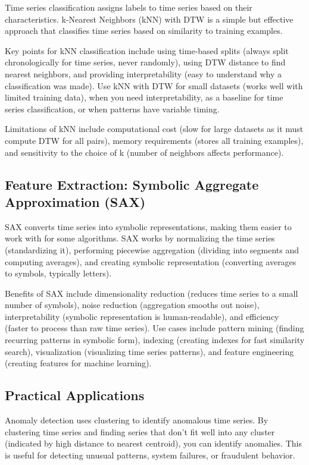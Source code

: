 Time series classification assigns labels to time series based on their characteristics. k-Nearest Neighbors (kNN) with DTW is a simple but effective approach that classifies time series based on similarity to training examples.

Key points for kNN classification include using time-based splits (always split chronologically for time series, never randomly), using DTW distance to find nearest neighbors, and providing interpretability (easy to understand why a classification was made). Use kNN with DTW for small datasets (works well with limited training data), when you need interpretability, as a baseline for time series classification, or when patterns have variable timing.

Limitations of kNN include computational cost (slow for large datasets as it must compute DTW for all pairs), memory requirements (stores all training examples), and sensitivity to the choice of k (number of neighbors affects performance).

\subsection{Feature Extraction: Symbolic Aggregate Approximation (SAX)}

SAX converts time series into symbolic representations, making them easier to work with for some algorithms. SAX works by normalizing the time series (standardizing it), performing piecewise aggregation (dividing into segments and computing averages), and creating symbolic representation (converting averages to symbols, typically letters).

Benefits of SAX include dimensionality reduction (reduces time series to a small number of symbols), noise reduction (aggregation smooths out noise), interpretability (symbolic representation is human-readable), and efficiency (faster to process than raw time series). Use cases include pattern mining (finding recurring patterns in symbolic form), indexing (creating indexes for fast similarity search), visualization (visualizing time series patterns), and feature engineering (creating features for machine learning).

\subsection{Practical Applications}

Anomaly detection uses clustering to identify anomalous time series. By clustering time series and finding series that don't fit well into any cluster (indicated by high distance to nearest centroid), you can identify anomalies. This is useful for detecting unusual patterns, system failures, or fraudulent behavior.


